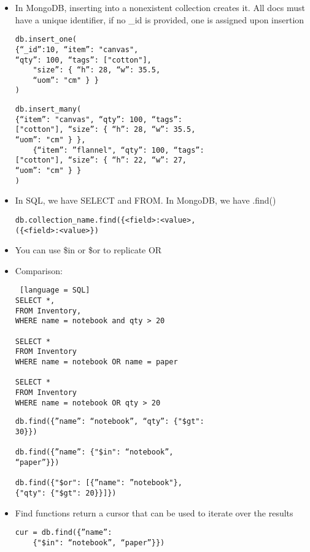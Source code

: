 \documentclass[8pt,landscape,a4paper, fleqn, dvipsnames]{extarticle}
\begin{document}
\begin{multicols*}{4}
\begin{itemize}
    \item In MongoDB, inserting into a nonexistent collection creates it. All docs must have a unique identifier, if no \_id is provided, one is assigned upon insertion
    \begin{verbatim}
db.insert_one(
{“_id”:10, “item”: "canvas", 
“qty”: 100, “tags”: ["cotton"], 
    "size”: { “h”: 28, “w”: 35.5,
    “uom”: "cm" } }
)           
    \end{verbatim}
    \begin{verbatim}
db.insert_many(
{“item”: "canvas", “qty”: 100, “tags”:
["cotton"], “size”: { “h”: 28, “w”: 35.5, 
“uom”: "cm" } },
    {“item”: ”flannel", “qty”: 100, “tags”:
["cotton"], “size”: { “h”: 22, “w”: 27, 
“uom”: "cm" } }
)        
    \end{verbatim}
    \item In SQL, we have SELECT and FROM. In MongoDB, we have .find()
    \begin{verbatim}
db.collection_name.find({<field>:<value>,
({<field>:<value>})      
    \end{verbatim}
    \item You can use \$in or \$or to replicate OR
    \item Comparison:
    \begin{lstlisting} [language = SQL]
SELECT *,
FROM Inventory,
WHERE name = notebook and qty > 20

SELECT *
FROM Inventory 
WHERE name = notebook OR name = paper

SELECT * 
FROM Inventory 
WHERE name = notebook OR qty > 20
    \end{lstlisting}
    \begin{verbatim}
db.find({”name”: “notebook”, “qty”: {"$gt":
30}})      

db.find({”name”: {"$in": “notebook”, 
“paper”}})

db.find({"$or": [{”name": ”notebook"}, 
{"qty": {"$gt": 20}}]})
    \end{verbatim}
    \item Find functions return a cursor that can be used to iterate over the results
    \begin{verbatim}
cur = db.find({”name”: 
    {"$in": “notebook”, “paper”}})


\end{verbatim}
\end{itemize}
\end{multicols*}
\end{document}
